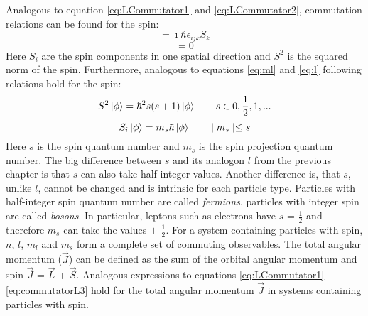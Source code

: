 Analogous to equation \ref{eq:LCommutator1} and \ref{eq:LCommutator2}, commutation relations can be found for the spin:
\begin{equation}
 [S_{i},S_{j}]=\imath\hbar\epsilon_{ijk}S_{k}
\end{equation} 
\begin{equation}
 [S_{i},S^{2}]=0
\end{equation} 
Here $S_{i}$ are the spin components in one spatial direction and $S^{2}$ is the squared norm of the spin. Furthermore, analogous to equations \ref{eq:ml} and \ref{eq:l} following relations hold for the spin:
\begin{equation}
 S^{2}\ket{\phi}=\hbar^{2}s(s+1)\ket{\phi} \hspace{2em} s\in{0,\frac{1}{2},1,...} 
\end{equation} 
\begin{equation}
 S_{i}\ket{\phi}=m_{s}\hbar\ket{\phi} \hspace{2em} \mid m_{s} \mid \leq \textit{s}
\end{equation} 
Here $s$ is the spin quantum number and $m_{s}$ is the spin projection quantum number. The big difference between $s$ and its analogon $l$ from the previous chapter is that $s$ can also take half-integer values. Another difference is, that $s$, unlike $l$, cannot be changed and is intrinsic for each particle type. Particles with half-integer spin quantum number are called \textit{fermions}, particles with integer spin are called \textit{bosons}. In particular, leptons such as electrons have $s$ = $\frac{1}{2}$ and therefore $m_{s}$ can take the values $\pm$ $\frac{1}{2}$. For a system containing particles with spin, $n$, $l$, $m_{l}$ and $m_{s}$ form a complete set of commuting observables. The total angular momentum ($\vec{J}$) can be defined as the sum of the orbital angular momentum and spin $\vec{J}$ = $\vec{L}$ + $\vec{S}$. Analogous expressions to equations \ref{eq:LCommutator1} - \ref{eq:commutatorL3} hold for the total angular momentum $\vec{J}$ in systems containing particles with spin.

